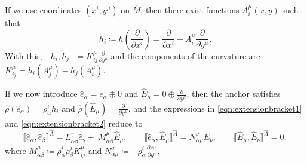 \documentclass[11pt]{article}
\theoremstyle{plain}
\theoremstyle{definition}
\begin{document}
If we use coordinates $(x^i,y^\mu)$ on $\overline M$, then there exist functions $A^\mu_i(x,y)$ such that  
\begin{equation*}
    h_i\coloneqq h\left(\frac{\partial}{\partial x^i}\right) = \frac{\partial}{\partial x^i} + A^\mu_i \frac{\partial}{\partial y^\mu}.
\end{equation*}
With this, $[h_i,h_j] = K^\mu_{ij}\frac{\partial}{\partial y^\mu}$ and the components of the curvature are $K^\mu_{ij}=h_i(A^\mu_j)-h_j(A^\mu_i)$.


If we now introduce ${\hat e}_\alpha = e_\alpha\oplus 0$ and ${\widehat E}_\mu = 0\oplus \frac{\partial}{\partial y^\mu}$, then the anchor satisfies $\hat{\rho}(\hat{e}_{\alpha}) =\rho_{\alpha}^ih_i$ and $\hat{\rho}(\widehat{E}_{\mu})=\frac{\partial}{\partial y^{\mu}}$, and the expressions in \eqref{eqn:extensionbracket1} and \eqref{eqn:extensionbracket2} reduce to
\begin{equation*}\label{eqn:bracketshat}
    \llbracket \hat{e}_{\alpha},\hat{e}_{\beta}\rrbracket^{\widehat A}=L_{\alpha\beta}^\gamma {\hat e}_\gamma + \ M^\mu_{\alpha\beta}{\widehat E}_\mu,\qquad \llbracket \hat{e}_{\alpha},\widehat{E}_{\mu}\rrbracket^{\widehat A}= N^\nu_{\alpha\mu}{\widehat E}_\nu,\qquad \llbracket \widehat{E}_{\mu},\widehat{E}_{\nu}\rrbracket^{\widehat A}=0,
\end{equation*}
where $M^\mu_{\alpha\beta}\coloneqq \rho^i_\alpha\rho^j_\beta K^\mu_{ij}$ and $N^\nu_{\alpha\mu}\coloneqq - \rho^i_\alpha\frac{\partial A^\nu_i}{\partial y^\mu}$.


\end{document}
